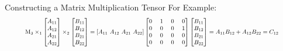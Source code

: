 \documentclass[final,hyperref={pdfpagelabels=false}]{beamer}
\begin{document}
\begin{frame}[t]
\begin{columns}[t]
\begin{column}{.5\linewidth}
\begin{block}{Constructing a Matrix Multiplication Tensor}
            For Example:
            \begin{equation*}
                \resizebox{0.9\textwidth}{!}{$
                \text{M}_3 \times_1
                \begin{bmatrix}
                    A_{11}\\
                    A_{12}\\
                    A_{21}\\
                    A_{22}
                \end{bmatrix}
                \times_2
                \begin{bmatrix}
                    B_{11}\\
                    B_{12}\\
                    B_{21}\\
                    B_{22}
                \end{bmatrix}
                =
                [A_{11} \ A_{12} \ A_{21} \ A_{22}]
                \begin{bmatrix}
                    0\ & 1\ & 0\ & 0 \\
                    0\ & 0\ & 0\ & 1 \\
                    0\ & 0\ & 0\ & 0 \\
                    0\ & 0\ & 0\ & 0
                \end{bmatrix}
                \begin{bmatrix}
                    B_{11}\\
                    B_{12}\\
                    B_{21}\\
                    B_{22}
                \end{bmatrix}
                = A_{11}B_{12} + A_{12}B_{22} = C_{12}$}
            \end{equation*}


\end{block}
\end{column}
\end{columns}
\end{frame}
\end{document}
